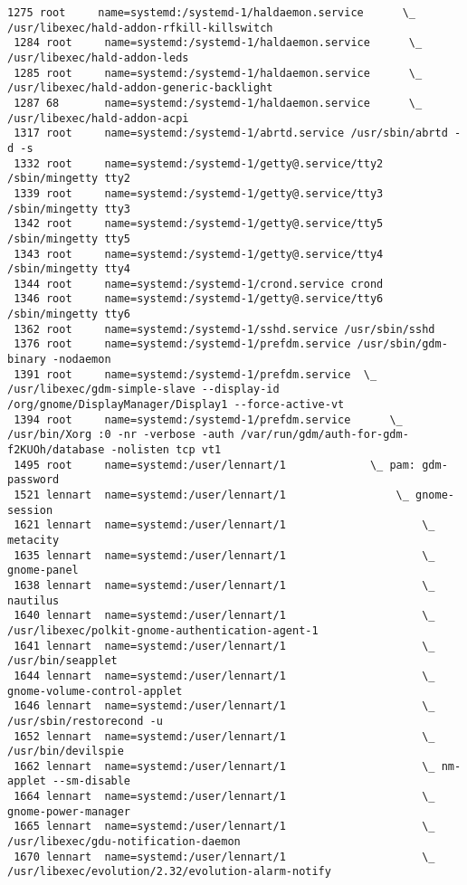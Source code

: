 \documentclass[10pt,oneside,a4paper]{article}
\begin{document}
\begin{landscape}
\begin{Verbatim}[fontsize=\small]
 1275 root     name=systemd:/systemd-1/haldaemon.service      \_ /usr/libexec/hald-addon-rfkill-killswitch
 1284 root     name=systemd:/systemd-1/haldaemon.service      \_ /usr/libexec/hald-addon-leds
 1285 root     name=systemd:/systemd-1/haldaemon.service      \_ /usr/libexec/hald-addon-generic-backlight
 1287 68       name=systemd:/systemd-1/haldaemon.service      \_ /usr/libexec/hald-addon-acpi
 1317 root     name=systemd:/systemd-1/abrtd.service /usr/sbin/abrtd -d -s
 1332 root     name=systemd:/systemd-1/getty@.service/tty2 /sbin/mingetty tty2
 1339 root     name=systemd:/systemd-1/getty@.service/tty3 /sbin/mingetty tty3
 1342 root     name=systemd:/systemd-1/getty@.service/tty5 /sbin/mingetty tty5
 1343 root     name=systemd:/systemd-1/getty@.service/tty4 /sbin/mingetty tty4
 1344 root     name=systemd:/systemd-1/crond.service crond
 1346 root     name=systemd:/systemd-1/getty@.service/tty6 /sbin/mingetty tty6
 1362 root     name=systemd:/systemd-1/sshd.service /usr/sbin/sshd
 1376 root     name=systemd:/systemd-1/prefdm.service /usr/sbin/gdm-binary -nodaemon
 1391 root     name=systemd:/systemd-1/prefdm.service  \_ /usr/libexec/gdm-simple-slave --display-id /org/gnome/DisplayManager/Display1 --force-active-vt
 1394 root     name=systemd:/systemd-1/prefdm.service      \_ /usr/bin/Xorg :0 -nr -verbose -auth /var/run/gdm/auth-for-gdm-f2KUOh/database -nolisten tcp vt1
 1495 root     name=systemd:/user/lennart/1             \_ pam: gdm-password
 1521 lennart  name=systemd:/user/lennart/1                 \_ gnome-session
 1621 lennart  name=systemd:/user/lennart/1                     \_ metacity
 1635 lennart  name=systemd:/user/lennart/1                     \_ gnome-panel
 1638 lennart  name=systemd:/user/lennart/1                     \_ nautilus
 1640 lennart  name=systemd:/user/lennart/1                     \_ /usr/libexec/polkit-gnome-authentication-agent-1
 1641 lennart  name=systemd:/user/lennart/1                     \_ /usr/bin/seapplet
 1644 lennart  name=systemd:/user/lennart/1                     \_ gnome-volume-control-applet
 1646 lennart  name=systemd:/user/lennart/1                     \_ /usr/sbin/restorecond -u
 1652 lennart  name=systemd:/user/lennart/1                     \_ /usr/bin/devilspie
 1662 lennart  name=systemd:/user/lennart/1                     \_ nm-applet --sm-disable
 1664 lennart  name=systemd:/user/lennart/1                     \_ gnome-power-manager
 1665 lennart  name=systemd:/user/lennart/1                     \_ /usr/libexec/gdu-notification-daemon
 1670 lennart  name=systemd:/user/lennart/1                     \_ /usr/libexec/evolution/2.32/evolution-alarm-notify

\end{Verbatim}
\end{landscape}
\end{document}
